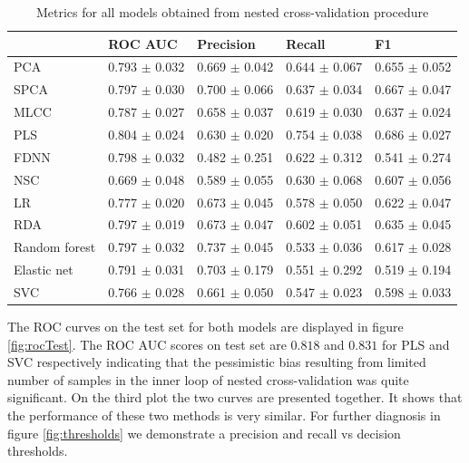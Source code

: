 \documentclass[shortabstract, english, mgr]{iithesis}
\begin{document}
\begin{table}
\centering
\begin{tabular}{lllll}
\toprule
{} &            ROC AUC &          Precision &             Recall &                 F1 \\
\midrule
PCA                               &  0.793 $\pm$ 0.032 &  0.669 $\pm$ 0.042 &  0.644 $\pm$ 0.067 &  0.655 $\pm$ 0.052 \\
SPCA                              &  0.797 $\pm$ 0.030 &  0.700 $\pm$ 0.066 &  0.637 $\pm$ 0.034 &  0.667 $\pm$ 0.047 \\
MLCC                              &  0.787 $\pm$ 0.027 &  0.658 $\pm$ 0.037 &  0.619 $\pm$ 0.030 &  0.637 $\pm$ 0.024 \\
PLS                               &  0.804 $\pm$ 0.024 &  0.630 $\pm$ 0.020 &  0.754 $\pm$ 0.038 &  0.686 $\pm$ 0.027 \\
FDNN                              &  0.798 $\pm$ 0.032 &  0.482 $\pm$ 0.251 &  0.622 $\pm$ 0.312 &  0.541 $\pm$ 0.274 \\
NSC       &  0.669 $\pm$ 0.048 &  0.589 $\pm$ 0.055 &  0.630 $\pm$ 0.068 &  0.607 $\pm$ 0.056 \\
LR               &  0.777 $\pm$ 0.020 &  0.673 $\pm$ 0.045 &  0.578 $\pm$ 0.050 &  0.622 $\pm$ 0.047 \\
RDA &  0.797 $\pm$ 0.019 &  0.673 $\pm$ 0.047 &  0.602 $\pm$ 0.051 &  0.635 $\pm$ 0.045 \\
Random forest                     &  0.797 $\pm$ 0.032 &  0.737 $\pm$ 0.045 &  0.533 $\pm$ 0.036 &  0.617 $\pm$ 0.028 \\
Elastic net                       &  0.791 $\pm$ 0.031 &  0.703 $\pm$ 0.179 &  0.551 $\pm$ 0.292 &  0.519 $\pm$ 0.194 \\
SVC                        &  0.766 $\pm$ 0.028 &  0.661 $\pm$ 0.050 &  0.547 $\pm$ 0.023 &  0.598 $\pm$ 0.033 \\
\bottomrule
\end{tabular}
\caption{Metrics for all models obtained from nested cross-validation procedure}
    \label{tab:ncv-metrics}
\end{table}

The ROC curves on the test set for both models are displayed in figure \ref{fig:rocTest}. The ROC AUC scores on test set are $0.818$ and $0.831$ for PLS and SVC respectively indicating that the pessimistic bias resulting from limited number of samples in the inner loop of nested cross-validation was quite significant. On the third plot the two curves are presented together. It shows that the performance of these two methods is very similar. For further diagnosis in figure \ref{fig:thresholds} we demonstrate a precision and recall vs decision thresholds.
\end{document}
